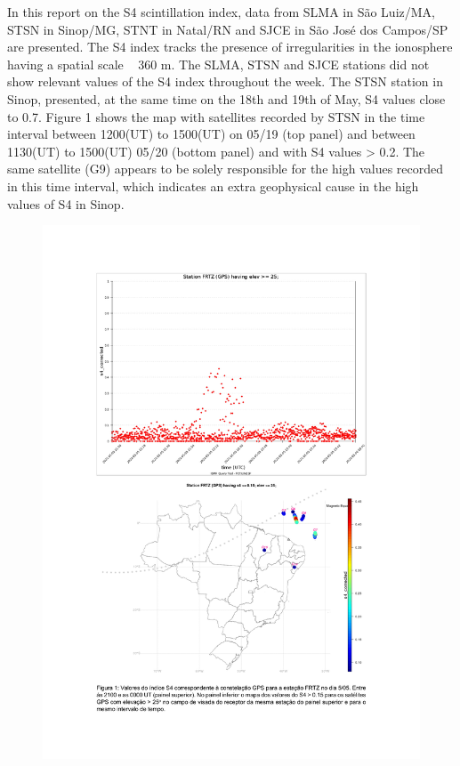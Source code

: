 \documentclass[a4paper, 10pt]{article}
\begin{document}
In this report on the S4 scintillation index, data from SLMA in São Luiz/MA, STSN 
in Sinop/MG, STNT in Natal/RN and SJCE in São José dos Campos/SP are 
presented. The S4 index tracks the presence of irregularities in the ionosphere 
having a spatial scale ~ 360 m. 
The SLMA, STSN and SJCE stations did not show relevant values of the S4 index 
throughout the week. The STSN station in Sinop, presented, at the same time on 
the 18th and 19th of May, S4 values close to 0.7. Figure 1 shows the map with 
satellites recorded by STSN in the time interval between 1200(UT) to 1500(UT) 
on 05/19 (top panel) and between 1130(UT) to 1500(UT) 05/20 (bottom panel) 
and with S4 values > 0.2. The same satellite (G9) appears to be solely 
responsible for the high values recorded in this time interval, which indicates an 
extra geophysical cause in the high values of S4 in Sinop. 
\begin{figure}[H]
    
                        \centering
   
                             \includegraphics[width=14cm]{./figures/en_outfileScint_0.jpg}

                        \end{figure}

                     
\end{document}
